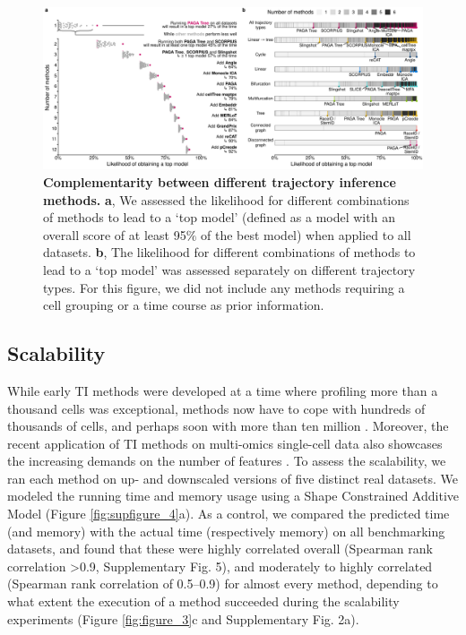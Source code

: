\begin{figure}
	\centering\includegraphics[width=\linewidth]{fig/dynbenchmark/figure_4.pdf}
	\caption{
		\textbf{Complementarity between different trajectory inference methods.}
		\textbf{a}, We assessed the likelihood for different combinations of methods to lead to a ‘top model’ (defined as a model with an overall score of at least 95$\%$ of the best model) when applied to all datasets. \textbf{b}, The likelihood for different combinations of methods to lead to a ‘top model’ was assessed separately on different trajectory types. For this figure, we did not include any methods requiring a cell grouping or a time course as prior information.
	}
	\label{fig:figure_4}
\end{figure}

\subsection{Scalability}

While early TI methods were developed at a time where profiling more than a thousand cells was exceptional, methods now have to cope with hundreds of thousands of cells, and perhaps soon with more than ten million \cite{svensson_exponentialscalingsinglecell_2018}. Moreover, the recent application of TI methods on multi-omics single-cell data also showcases the increasing demands on the number of features \cite{cao_jointprofilingchromatin_2018}. To assess the scalability, we ran each method on up- and downscaled versions of five distinct real datasets. We modeled the running time and memory usage using a Shape Constrained Additive Model \cite{pya_shapeconstrainedadditive_2015} (Figure \ref{fig:supfigure_4}a). As a control, we compared the predicted time (and memory) with the actual time (respectively memory) on all benchmarking datasets, and found that these were highly correlated overall (Spearman rank correlation >0.9, Supplementary Fig. 5), and moderately to highly correlated (Spearman rank correlation of 0.5–0.9) for almost every method, depending to what extent the execution of a method succeeded during the scalability experiments (Figure \ref{fig:figure_3}c and Supplementary Fig. 2a).

